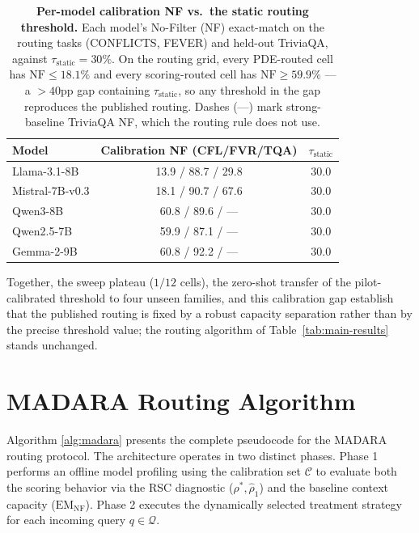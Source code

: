 \documentclass[11pt]{article}
\theoremstyle{definition}
\begin{document}
\begin{table}[ht]
\centering
\small
\setlength{\tabcolsep}{8pt}
\begin{tabular}{@{}lcc@{}}
\toprule
\textbf{Model} & \textbf{Calibration NF (CFL/FVR/TQA)} & \textbf{\(\tau_{\text{static}}\)} \\
\midrule
Llama-3.1-8B    & 13.9 / 88.7 / 29.8 & 30.0 \\
Mistral-7B-v0.3 & 18.1 / 90.7 / 67.6 & 30.0 \\
Qwen3-8B        & 60.8 / 89.6 / ---  & 30.0 \\
Qwen2.5-7B      & 59.9 / 87.1 / ---  & 30.0 \\
Gemma-2-9B      & 60.8 / 92.2 / ---  & 30.0 \\
\bottomrule
\end{tabular}
\caption{\textbf{Per-model calibration NF vs.\ the static routing threshold.} Each model's No-Filter (NF) exact-match on the routing tasks (CONFLICTS, FEVER) and held-out TriviaQA, against \(\tau_{\text{static}}=30\%\). On the routing grid, every PDE-routed cell has \(\text{NF}\le 18.1\%\) and every scoring-routed cell has \(\text{NF}\ge 59.9\%\) --- a \({>}40\)pp gap containing \(\tau_{\text{static}}\), so any threshold in the gap reproduces the published routing. Dashes (---) mark strong-baseline TriviaQA NF, which the routing rule does not use.}
\label{tab:tau-dyn}
\end{table}

Together, the sweep plateau (\(1/12\) cells), the zero-shot transfer of the pilot-calibrated threshold to four unseen families, and this calibration gap establish that the published routing is fixed by a robust capacity separation rather than by the precise threshold value; the routing algorithm of Table~\ref{tab:main-results} stands unchanged.


\section{MADARA Routing Algorithm}
\label{sec:appendix-madara-algorithm}

Algorithm \ref{alg:madara} presents the complete pseudocode for the MADARA routing protocol. The architecture operates in two distinct phases. Phase 1 performs an offline model profiling using the calibration set \(\mathcal{C}\) to evaluate both the scoring behavior via the RSC diagnostic (\(\rho^*, \hat{\rho}_1\)) and the baseline context capacity (\(\text{EM}_{\text{NF}}\)). Phase 2 executes the dynamically selected treatment strategy for each incoming query \(q \in \mathcal{Q}\). 
\end{document}
